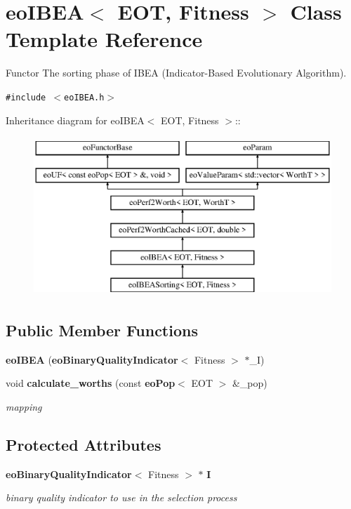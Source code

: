 \section{eo\-IBEA$<$ EOT, Fitness $>$ Class Template Reference}
\label{classeoIBEA}
Functor The sorting phase of IBEA (Indicator-Based Evolutionary Algorithm).  


{\tt \#include $<$eo\-IBEA.h$>$}

Inheritance diagram for eo\-IBEA$<$ EOT, Fitness $>$::\begin{figure}[H]
\begin{center}
\leavevmode
\includegraphics[height=6cm]{classeoIBEA}
\end{center}
\end{figure}
\subsection*{Public Member Functions}
\begin{CompactItemize}
\item 
{\bf eo\-IBEA} ({\bf eo\-Binary\-Quality\-Indicator}$<$ Fitness $>$ $\ast$\_\-I)\label{classeoIBEA_703833c1f773136b24d2ca5c7cff4b2d}

\item 
void {\bf calculate\_\-worths} (const {\bf eo\-Pop}$<$ EOT $>$ \&\_\-pop)
\begin{CompactList}\small\item\em mapping \item\end{CompactList}\end{CompactItemize}
\subsection*{Protected Attributes}
\begin{CompactItemize}
\item 
{\bf eo\-Binary\-Quality\-Indicator}$<$ Fitness $>$ $\ast$ {\bf I}\label{classeoIBEA_f69a9efad202b67ee51d538d14d587e6}

\begin{CompactList}\small\item\em binary quality indicator to use in the selection process \item\end{CompactList}\end{CompactItemize}


